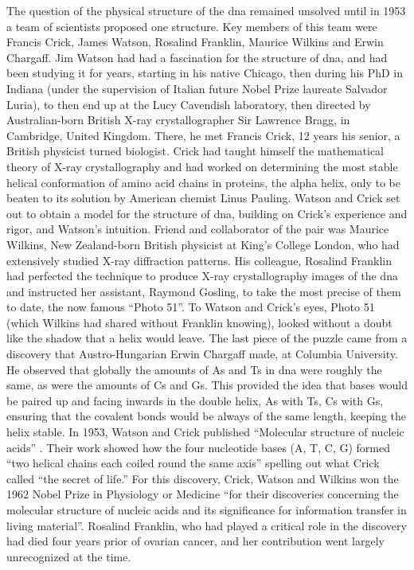The question of the physical structure of the \gls{dna} remained unsolved until in 1953 a team of scientists proposed one structure. 
Key members of this team were Francis Crick, James Watson, Rosalind Franklin, Maurice Wilkins and Erwin Chargaff. 
Jim Watson had had a fascination for the structure of \gls{dna}, and had been studying it for years, starting in his native Chicago, then during his PhD in Indiana (under the supervision of Italian future Nobel Prize laureate Salvador Luria), to then end up at the Lucy Cavendish laboratory, then directed by Australian-born British X-ray crystallographer Sir Lawrence Bragg, in Cambridge, United Kingdom. 
There, he met Francis Crick, 12 years his senior, a British physicist turned biologist. 
Crick had taught himself the mathematical theory of X-ray crystallography and had worked on determining the most stable helical conformation of amino acid chains in proteins, the alpha helix, only to be beaten to its solution by American chemist Linus Pauling. 
Watson and Crick set out to obtain a model for the structure of \gls{dna}, building on Crick’s experience and rigor, and Watson’s intuition. 
Friend and collaborator of the pair was Maurice Wilkins, New Zealand-born British physicist at King’s College London, who had extensively studied X-ray diffraction patterns. 
His colleague, Rosalind Franklin had perfected the technique to produce X-ray crystallography images of the \gls{dna} and instructed her assistant, Raymond Gosling, to take the most precise of them to date, the now famous “Photo 51”. 
To Watson and Crick’s eyes, Photo 51 (which Wilkins had shared without Franklin knowing), looked without a doubt like the shadow that a helix would leave. The last piece of the puzzle came from a discovery that Austro-Hungarian Erwin Chargaff made, at Columbia University. He observed that globally the amounts of As and Ts in \gls{dna} were roughly the same, as were the amounts of Cs and Gs. 
This provided the idea that bases would be paired up and facing inwards in the double helix, As with Ts, Cs with Gs, ensuring that the covalent bonds would be always of the same length, keeping the helix stable. 
In 1953, Watson and Crick published “Molecular structure of nucleic acids” \cite{watson1953molecular}. 
Their work showed how the four nucleotide bases (A, T, C, G) formed “two helical chains each coiled round the same axis” \cite{watson1953molecular} spelling out what Crick called “the secret of life.” 
For this discovery, Crick, Watson and Wilkins won the 1962 Nobel Prize in Physiology or Medicine “for their discoveries concerning the molecular structure of nucleic acids and its significance for information transfer in living material”. 
Rosalind Franklin, who had played a critical role in the discovery had died four years prior of ovarian cancer, and her contribution went largely unrecognized at the time.

